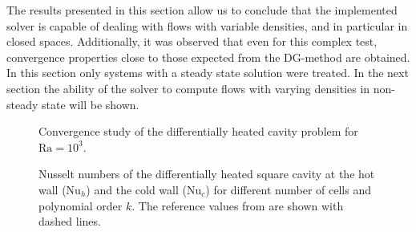 The results presented in this section allow us to conclude that the implemented solver is capable of dealing with flows with variable densities, and in particular in closed spaces. Additionally, it was observed that even for this complex test, convergence properties close to those expected from the DG-method are obtained. In this section only systems with a steady state solution were treated. In the next section the ability of the solver to compute flows with varying densities in non-steady state will be shown.

\begin{figure}[tb]
	\centering
	\pgfplotsset{width=0.34\textwidth, compat=1.3}
	\caption{Convergence study of the differentially heated cavity problem for $\text{Ra} = 10^3$.}\label{fig:ConvergenceDHC}
\end{figure}
\begin{figure}[tb]
	\centering
	\caption[Nusselt numbers of the differentially heated square cavity at the hot wall ($\text{Nu}_h$) and the cold wall ($\text{Nu}_c$) for different number of cells and polynomial order $k$.]{Nusselt numbers of the differentially heated square cavity at the hot wall ($\text{Nu}_h$) and the cold wall ($\text{Nu}_c$) for different number of cells and polynomial order $k$. The reference values from \cite{vierendeelsBenchmarkSolutionsNatural2003} are shown with dashed lines.}\label{fig:NusseltStudy}
\end{figure}
\FloatBarrier
